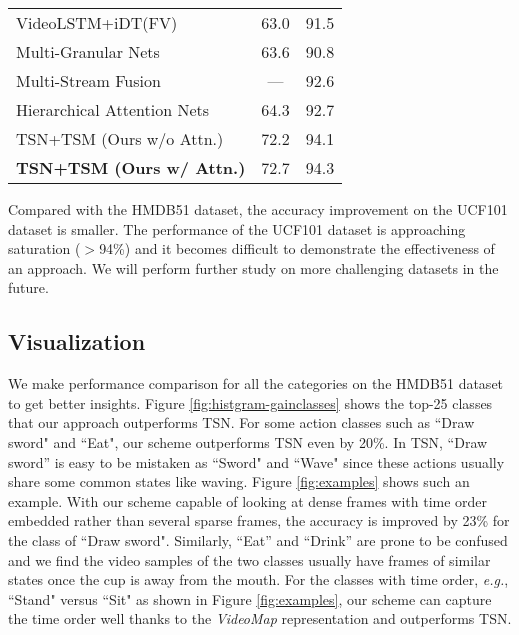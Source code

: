 \documentclass[english, 10pt, twocolumn, twoside]{IEEEtran}
\begin{document}
\begin{table}[h]
\begin{center}
\begin{tabular}{|l|c|c|}
         VideoLSTM+iDT(FV)~\cite{li2016videolstm} & 63.0 & 91.5 \\
       Multi-Granular Nets~\cite{li2016action} & 63.6 & 90.8 \\
Multi-Stream Fusion~\cite{wu2016multi} & --- & 92.6 \\			
       Hierarchical Attention Nets~\cite{wang2016hierarchical} & 64.3 & 92.7 \\


       \hline \hline
     TSN+TSM (Ours w/o Attn.) & 72.2 & 94.1 \\
     \textbf{TSN+TSM (Ours w/ Attn.)} & 72.7 & 94.3 \\
       \hline
     \end{tabular}
   \end{center}
\vspace{-4mm}
\end{table}

Compared with the HMDB51 dataset, the accuracy improvement on the UCF101 dataset is smaller. The performance of the UCF101 dataset is approaching saturation ($>$94\%) and it becomes difficult to demonstrate the effectiveness of an approach. We will perform further study on more challenging datasets in the future.

\subsection{Visualization}

We make performance comparison for all the categories on the HMDB51 dataset to get better insights. Figure \ref{fig:histgram-gainclasses} shows the top-25 classes that our approach outperforms TSN. For some action classes such as ``Draw sword" and ``Eat", our scheme outperforms TSN even by 20\%.
In TSN, ``Draw sword'' is easy to be mistaken as ``Sword" and ``Wave" since these actions usually share some common states like  waving. Figure \ref{fig:examples} shows such an example. With our scheme capable of looking at dense frames with time order embedded rather than several sparse frames, the accuracy is improved by 23\% for the class of ``Draw sword". Similarly, ``Eat'' and ``Drink'' are prone to be confused and we find the video samples of the two classes usually have frames of similar states once the cup is away from the mouth. For the classes with time order, \emph{e.g.}, ``Stand" versus ``Sit" as shown in Figure \ref{fig:examples}, our scheme can capture the time order well thanks to the \emph{VideoMap} representation and outperforms TSN.
\end{document}
